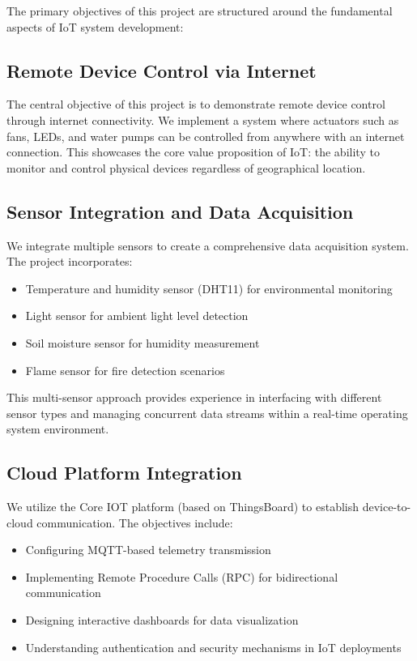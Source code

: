 The primary objectives of this project are structured around the fundamental aspects of IoT system development:

\subsection*{Remote Device Control via Internet}

The central objective of this project is to demonstrate remote device control through internet connectivity. We implement a system where actuators such as fans, LEDs, and water pumps can be controlled from anywhere with an internet connection. This showcases the core value proposition of IoT: the ability to monitor and control physical devices regardless of geographical location.

\subsection*{Sensor Integration and Data Acquisition}

We integrate multiple sensors to create a comprehensive data acquisition system. The project incorporates:
\begin{itemize}
    \item Temperature and humidity sensor (DHT11) for environmental monitoring
    \item Light sensor for ambient light level detection
    \item Soil moisture sensor for humidity measurement
    \item Flame sensor for fire detection scenarios
\end{itemize}

This multi-sensor approach provides experience in interfacing with different sensor types and managing concurrent data streams within a real-time operating system environment.

\subsection*{Cloud Platform Integration}

We utilize the Core IOT platform (based on ThingsBoard) to establish device-to-cloud communication. The objectives include:
\begin{itemize}
    \item Configuring MQTT-based telemetry transmission
    \item Implementing Remote Procedure Calls (RPC) for bidirectional communication
    \item Designing interactive dashboards for data visualization
    \item Understanding authentication and security mechanisms in IoT deployments
\end{itemize}

